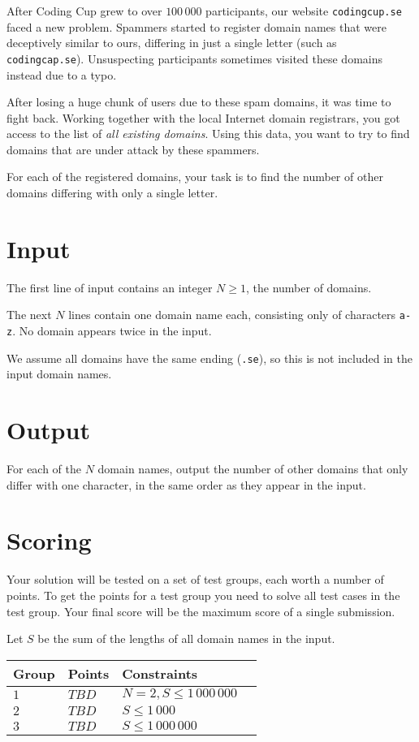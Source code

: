 After Coding Cup grew to over $100\,000$ participants, our website \texttt{codingcup.se} faced a new problem.
Spammers started to register domain names that were deceptively similar to ours, differing in just a single letter (such as \texttt{codingcap.se}).
Unsuspecting participants sometimes visited these domains instead due to a typo.

After losing a huge chunk of users due to these spam domains, it was time to fight back.
Working together with the local Internet domain registrars, you got access to the list of \emph{all existing domains}.
Using this data, you want to try to find domains that are under attack by these spammers.

For each of the registered domains, your task is to find the number of other domains differing with only a single letter.

\section*{Input}
The first line of input contains an integer $N \ge 1$, the number of domains.

The next $N$ lines contain one domain name each, consisting only of characters \texttt{a-z}.
No domain appears twice in the input.

We assume all domains have the same ending (\texttt{.se}), so this is not included in the input domain names.

\section*{Output}
For each of the $N$ domain names, output the number of other domains that only differ with one character, in the same order as they appear in the input.

\section*{Scoring}
Your solution will be tested on a set of test groups, each worth a number of points.
To get the points for a test group you need to solve all test cases in the test group.
Your final score will be the maximum score of a single submission.

Let $S$ be the sum of the lengths of all domain names in the input.

\noindent
\begin{tabular}{| l | l | l | l |}
\hline
Group & Points & Constraints \\ \hline
$1$    & $TBD$         & $N = 2, S \le 1\,000\,000$ \\ \hline
$2$    & $TBD$         & $S \le 1\,000$ \\ \hline
$3$    & $TBD$         & $S \le 1\,000\,000$ \\ \hline
\end{tabular}

